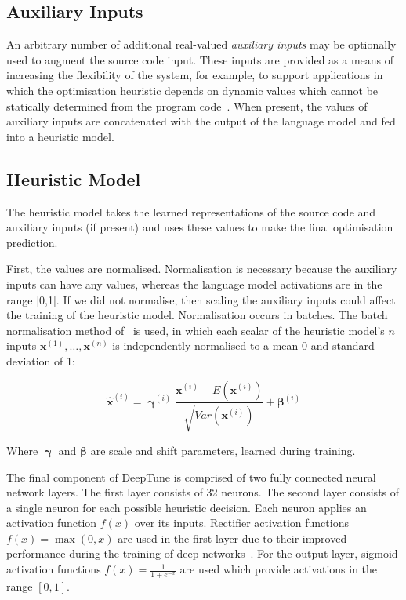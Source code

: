 \subsection{Auxiliary Inputs}

An arbitrary number of additional real-valued \emph{auxiliary inputs} may be optionally used to augment the source code input. These inputs are provided as a means of increasing the flexibility of the system, for example, to support applications in which the optimisation heuristic depends on dynamic values which cannot be statically determined from the program code~\cite{Ding2015,Stephenson2005}. When present, the values of auxiliary inputs are concatenated with the output of the language model and fed into a heuristic model.


\subsection{Heuristic Model}

The heuristic model takes the learned representations of the source code and auxiliary inputs (if present) and uses these values to make the final optimisation prediction.

First, the values are normalised. Normalisation is necessary because the auxiliary inputs can have any values, whereas the language model activations are in the range [0,1]. If we did not normalise, then scaling the auxiliary inputs could affect the training of the heuristic model. Normalisation occurs in batches. The batch normalisation method of~\cite{Ioffe2015a} is used, in which each scalar of the heuristic model's $n$ inputs $\bm{x}^{(1)}, \ldots, \bm{x}^{(n)}$ is independently normalised to a mean 0 and standard deviation of 1:

\begin{equation}
\bm{\hat{x}}^{(i)} = \bm{\upgamma}^{(i)} \frac{\bm{x}^{(i)} - E(\bm{x}^{(i)})}{\sqrt{Var(\bm{x}^{(i)})}} + \bm{\beta}^{(i)}
\end{equation}

Where $\bm{\upgamma}$ and $\bm{\beta}$ are scale and shift parameters, learned during training.

The final component of DeepTune is comprised of two fully connected neural network layers. The first layer consists of 32 neurons. The second layer consists of a single neuron for each possible heuristic decision. Each neuron applies an activation function $f(x)$ over its inputs. Rectifier activation functions $f(x) = \max(0, x)$ are used in the first layer due to their improved performance during the training of deep networks~\cite{Nair2010}. For the output layer, sigmoid activation functions $f(x) = \frac{1}{1+e^{-x}}$ are used which provide activations in the range $[0,1]$.

